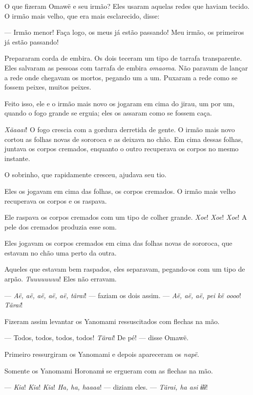 O que fizeram Omawë e seu irmão? Eles usaram aquelas redes que haviam
tecido. O irmão mais velho, que era mais esclarecido, disse: 

--- Irmão menor! Faça logo, os meus já estão passando! Meu irmão, os
primeiros já estão passando! 

Prepararam corda de embira. Os dois teceram um tipo de tarrafa transparente.
Eles salvaram as pessoas com tarrafa de embira \textit{omaoma}. Não paravam de
lançar a rede onde chegavam os mortos, pegando um a um. Puxaram a rede
como se fossem peixes, muitos peixes. 

Feito isso, ele e o irmão mais novo os jogaram em cima do jirau, um por
um, quando o fogo grande se erguia; eles os assaram como se fossem
caça. 

\textit{Xãaaai}! O fogo crescia com a gordura derretida de gente. O irmão
mais novo cortou as folhas novas de sororoca e as deixava no chão. Em
cima dessas folhas, juntava os corpos cremados, enquanto o outro
recuperava os corpos no mesmo instante. 

O sobrinho, que rapidamente cresceu, ajudava seu tio. 

Eles os jogavam em cima das folhas, os corpos cremados. O irmão mais
velho recuperava os corpos e os raspava. 

Ele raspava os corpos cremados com um tipo de colher grande. \textit{Xoe}! \textit{Xoe}!
\textit{Xoe}! A pele dos cremados produzia esse som. 

Eles jogavam os corpos cremados em cima das folhas novas de sororoca,
que estavam no chão uma perto da outra. 

Aqueles que estavam bem raspados, eles separavam, pegando-os com um
tipo de arpão. \textit{Tuuuuuuuu}! Eles não erravam. 

--- \textit{Aë, aë, aë, aë, aë, tãrai}! --- faziam os dois assim. --- \textit{Aë, aë, aë,
pei kë oooo}! \textit{Tãrai}! 

Fizeram assim levantar os Yanomami ressuscitados com flechas na mão. 

--- Todos, todos, todos, todos! \textit{Tãrai}! De pé! --- disse Omawë.

Primeiro ressurgiram os Yanomami e depois apareceram os \textit{napë}. 

Somente os Yanomami Horonamɨ se ergueram com as flechas na mão. 

--- \textit{Kia}! \textit{Kia}! \textit{Kia}! \textit{Ha, ha, haaaa}! --- diziam eles. --- \textit{Tãrai, ha asi
ɨ̃ɨɨ}! 

